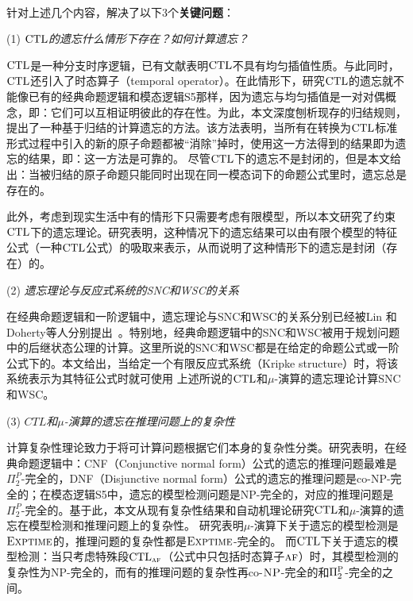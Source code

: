 ~\\
针对上述几个内容，解决了以下3个\textbf{关键问题}：

(1) {\em $\textrm{CTL}$的遗忘什么情形下存在？如何计算遗忘？}

$\textrm{CTL}$是一种分支时序逻辑，已有文献表明$\textrm{CTL}$不具有均匀插值性质。与此同时，$\textrm{CTL}$还引入了时态算子（temporal operator）。在此情形下，研究$\textrm{CTL}$的遗忘就不能像已有的经典命题逻辑和模态逻辑S5那样，因为遗忘与均匀插值是一对对偶概念，即：它们可以互相证明彼此的存在性。为此，本文深度刨析现存的归结规则，提出了一种基于归结的计算遗忘的方法。该方法表明，当所有在转换为$\textrm{CTL}$标准形式过程中引入的新的原子命题都被“消除”掉时，使用这一方法得到的结果即为遗忘的结果，即：这一方法是可靠的。
尽管$\textrm{CTL}$下的遗忘不是封闭的，但是本文给出：当被归结的原子命题只能同时出现在同一模态词下的命题公式里时，遗忘总是存在的。

此外，考虑到现实生活中有的情形下只需要考虑有限模型，所以本文研究了约束$\textrm{CTL}$下的遗忘理论。研究表明，这种情况下的遗忘结果可以由有限个模型的特征公式（一种$\textrm{CTL}$公式）的吸取来表示，从而说明了这种情形下的遗忘是封闭（存在）的。

(2) {\em 遗忘理论与反应式系统的SNC和WSC的关系}

在经典命题逻辑和一阶逻辑中，遗忘理论与SNC和WSC的关系分别已经被Lin 和 Doherty等人分别提出~\cite{DBLP:journals/ai/Lin01,DBLP:conf/ijcai/DohertyLS01}。特别地，经典命题逻辑中的SNC和WSC被用于规划问题中的后继状态公理的计算。这里所说的SNC和WSC都是在给定的命题公式或一阶公式下的。本文给出，当给定一个有限反应式系统（Kripke structure）时，将该系统表示为其特征公式时就可使用
上述所说的$\textrm{CTL}$和$\mu$-演算的遗忘理论计算SNC和WSC。



(3) {\em $CTL$和$\mu$-演算的遗忘在推理问题上的复杂性}

计算复杂性理论致力于将可计算问题根据它们本身的复杂性分类。研究表明，在经典命题逻辑中：CNF（Conjunctive normal form）公式的遗忘的推理问题最难是$\Pi_2^P$-完全的，DNF（Disjunctive normal form）公式的遗忘的推理问题是co-NP-完全的；在模态逻辑S5中，遗忘的模型检测问题是NP-完全的，对应的推理问题是$\Pi_2^P$-完全的。基于此，本文从现有复杂性结果和自动机理论研究$\textrm{CTL}$和$\mu$-演算的遗忘在模型检测和推理问题上的复杂性。
研究表明$\mu$-演算下关于遗忘的模型检测是$\textsc{Exptime}$的，推理问题的复杂性都是$\textsc{Exptime}$-完全的。
而$\textrm{CTL}$下关于遗忘的模型检测：当只考虑特殊段$\textrm{CTL}_{\textsc{a} \textsc{f}}$（公式中只包括时态算子$\textsc{a} \textsc{f}$）时，其模型检测的复杂性为\textsc{NP}-完全的，而有的推理问题的复杂性再co-$\textsc{NP}$-完全的和$\Pi_2^{\textsc{P}}$-完全的之间。








